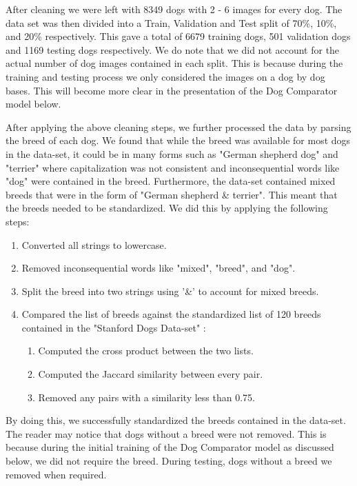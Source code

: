 \documentclass{article}
\begin{document}
\noindent After cleaning we were left with 8349 dogs with 2 - 6 images for every dog.  The data set was then divided into a Train, Validation and Test split of 70\%, 10\%, and 20\% respectively.  This gave a total of 6679 training dogs, 501 validation dogs and 1169 testing dogs respectively.  We do note that we did not account for the actual number of dog images contained in each split.  This is because during the training and testing process we only considered the images on a dog by dog bases.  This will become more clear in the presentation of the Dog Comparator model below.

After applying the above cleaning steps, we further processed the data by parsing the breed of each dog.  We found that while the breed was available for most dogs in the data-set, it could be in many forms such as "German shepherd dog" and "terrier" where capitalization was not consistent and inconsequential words like "dog" were contained in the breed.  Furthermore, the data-set contained mixed breeds that were in the form of "German shepherd \& terrier".  This meant that the breeds needed to be standardized.  We did this by applying the following steps:

\begin{enumerate}
  \item Converted all strings to lowercase.
  
  \item Removed inconsequential words like "mixed", "breed", and "dog".
  
  \item Split the breed into two strings using '\&' to account for mixed breeds.
    
  \item Compared the list of breeds against the  standardized list of 120 breeds contained in the "Stanford Dogs Data-set" \cite{stanforddogs}:
    \begin{enumerate}
      \item Computed the cross product between the two lists.
      \item Computed the Jaccard similarity between every pair.
      \item Removed any pairs with a similarity less than 0.75.
    \end{enumerate}
\end{enumerate} 

\noindent By doing this, we successfully standardized the breeds contained in the data-set.  The reader may notice that dogs without a breed were not removed.  This is because during the initial training of the Dog Comparator model as discussed below, we did not require the breed.  During testing, dogs without a breed we removed when required.
\end{document}
